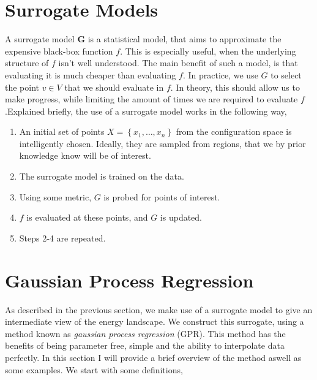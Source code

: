 \documentclass[working, oneside]{../../../Preambles/marginclass}
\begin{document}
\section{Surrogate Models}
A surrogate model $\bm{G}$ is a statistical model, that aims to approximate the expensive black-box function $f$. This is especially useful, when the underlying structure of $f$ isn't well understood.  The main benefit of such a model, is that evaluating it is much cheaper than evaluating $f$. In practice, we use $G$ to select the point $v \in V$ that we should evaluate in $f$. In theory, this should allow us to make progress, while limiting the amount of times we are required to evaluate $f$.Explained briefly, the use of a surrogate model works in the following way,
\begin{enumerate}
    \item An initial set of points $X = \left\{ x_1, \ldots, x_n \right\} $ from the configuration space is intelligently chosen. Ideally, they are sampled from regions, that we by prior knowledge know will be of interest.
    \item The surrogate model is trained on the data.
    \item Using some metric, $G$ is probed for points of interest.
    \item $f$ is evaluated at these points, and $G$ is updated.
    \item Steps 2-4 are repeated.
\end{enumerate}
\section{Gaussian Process Regression}
As described in the previous section, we make use of a surrogate model to give an intermediate view of the energy landscape. We construct this surrogate, using a method known as \textit{gaussian process regression} (GPR). This method has the benefits of being parameter free, simple and the ability to interpolate data perfectly. In this section I will provide a brief overview of the method aswell as some examples. We start with some definitions,
\end{document}
